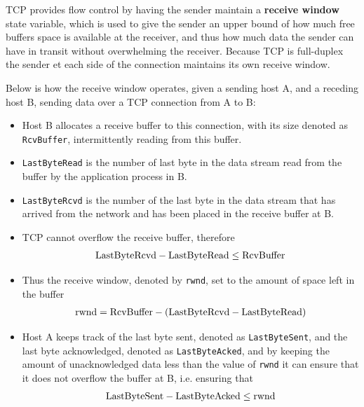 \documentclass[12pt letter]{report}
\begin{document}
TCP provides flow control by having the sender maintain a
\textbf{receive window} state variable, which is used to give the
sender an upper bound of how much free buffers space is available at
the receiver, and thus how much data the sender can have in transit
without overwhelming the receiver. Because TCP is full-duplex the
sender et each side of the connection maintains its own receive window.

Below is how the receive window operates, given a sending host A, and
a receding host B, sending data over a TCP connection from A to B:
\begin{itemize}
  \item Host B allocates a receive buffer to this connection, with
    its size denoted as \lstinline{RcvBuffer}, intermittently reading
    from this buffer.
  \item \lstinline{LastByteRead} is the number of last byte in the
    data stream read from the buffer by the application process in B.
  \item \lstinline{LastByteRcvd} is the number of the last byte in
    the data stream that has arrived from the network and has been
    placed in the receive buffer at B.
  \item TCP cannot overflow the receive buffer, therefore
    \begin{align*}
      \mbox{\lstinline{LastByteRcvd}} - \mbox{\lstinline{LastByteRead}} \leq
      \mbox{\lstinline{RcvBuffer}}
    \end{align*}
  \item Thus the receive window, denoted by \lstinline{rwnd}, set to
    the amount of space left in the buffer
    \begin{align*}
      \text{\lstinline{rwnd}} = \mbox{\lstinline{RcvBuffer}} -
      (\mbox{\lstinline{LastByteRcvd}} - \mbox{\lstinline{LastByteRead}})
    \end{align*}
  \item Host A keeps track of the last byte sent, denoted as
    \lstinline{LastByteSent}, and the last byte acknowledged, denoted
    as \lstinline{LastByteAcked}, and by keeping the amount of
    unacknowledged data less than the value of \lstinline{rwnd} it
    can ensure that it does not overflow the buffer at B, i.e. ensuring that
    \begin{align*}
      \text{\lstinline{LastByteSent}} -
      \text{\lstinline{LastByteAcked}} \leq \text{\lstinline{rwnd}}
    \end{align*}
\end{itemize}
\end{document}

